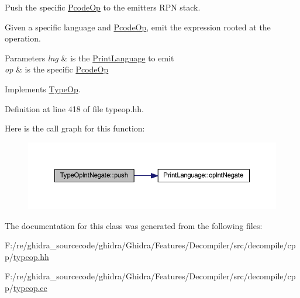 Push the specific \mbox{\hyperlink{class_pcode_op}{Pcode\+Op}} to the emitter\textquotesingle{}s R\+PN stack. 

Given a specific language and \mbox{\hyperlink{class_pcode_op}{Pcode\+Op}}, emit the expression rooted at the operation. 
\begin{DoxyParams}{Parameters}
{\em lng} & is the \mbox{\hyperlink{class_print_language}{Print\+Language}} to emit \\
\hline
{\em op} & is the specific \mbox{\hyperlink{class_pcode_op}{Pcode\+Op}} \\
\hline
\end{DoxyParams}


Implements \mbox{\hyperlink{class_type_op_ac9c9544203ed74dabe6ac662b653b2af}{Type\+Op}}.



Definition at line 418 of file typeop.\+hh.

Here is the call graph for this function\+:
\nopagebreak
\begin{figure}[H]
\begin{center}
\leavevmode
\includegraphics[width=350pt]{class_type_op_int_negate_aea54f310805501b412ad1423c681006e_cgraph}
\end{center}
\end{figure}


The documentation for this class was generated from the following files\+:\begin{DoxyCompactItemize}
\item 
F\+:/re/ghidra\+\_\+sourcecode/ghidra/\+Ghidra/\+Features/\+Decompiler/src/decompile/cpp/\mbox{\hyperlink{typeop_8hh}{typeop.\+hh}}\item 
F\+:/re/ghidra\+\_\+sourcecode/ghidra/\+Ghidra/\+Features/\+Decompiler/src/decompile/cpp/\mbox{\hyperlink{typeop_8cc}{typeop.\+cc}}\end{DoxyCompactItemize}
